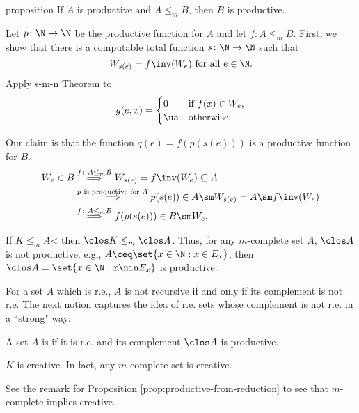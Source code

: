 \documentclass[class=article, crop=false]{standalone}
\begin{document}
\begin{result}{proposition}{\label{prop:productive-from-reduction}}
  If $A$ is productive and $A \leq_m B$, then $B$ is productive.
\end{result}
\begin{pf}
  Let $p\colon \N \to \N$ be the productive function for $A$ and let $f\colon A \leq_m B$. First, we show that there is a computable total function $s\colon \N \to \N$ such that
    \[
      W_{s(e)} = f\inv (W_e) \text{ for all } e \in \N.
    \]
  Apply s-m-n Theorem to
    \[
      g(e,x) =
        \begin{cases}
          0 & \text{if } f(x) \in W_e, \\
          \ua & \text{otherwise}.
        \end{cases}
    \]

  Our claim is that the function $q(e) = f(p(s(e)))$ is a productive function for $B$.
    \begin{align*}
      W_e \in B & \stackrel{f\colon A \leq_m B}{\implies} W_{s(e)} = f\inv (W_e) \subseteq A \\
        & \stackrel{p \text{ is productive for } A}{\implies} p(s(e)) \in A \sm W_{s(e)} = A \sm f\inv (W_e) \\
        & \stackrel{f\colon A \leq_m B}{\implies} f(p(s(e))) \in B\sm W_e.
    \end{align*}
\end{pf}

\begin{rem}
  If $K \leq_m A$< then $\clos K \leq_m \clos A$. Thus, for any $m$-complete set $A$, $\clos A$ is not productive. e.g., $A \ceq \set{x \in \N : x \in E_x}$, then $\clos A = \set{x \in \N : x \nin E_x}$ is productive.
\end{rem}

For a set $A$ which is r.e., $A$ is not recursive if and only if its complement is not r.e. The next notion captures the idea of r.e. sets whose complement is not r.e. in a ``strong" way:

\begin{defn}
  A set $A$ is  if it is r.e. and its complement $\clos A$ is productive.
\end{defn}

\begin{ex}{\label{ex:m-complete-implies-creative}}
  $K$ is creative. In fact, any $m$-complete set is creative.

  \begin{pf}
    See the remark for Proposition \ref{prop:productive-from-reduction} to see that $m$-complete implies creative.
  \end{pf}
\end{ex}
\end{document}
